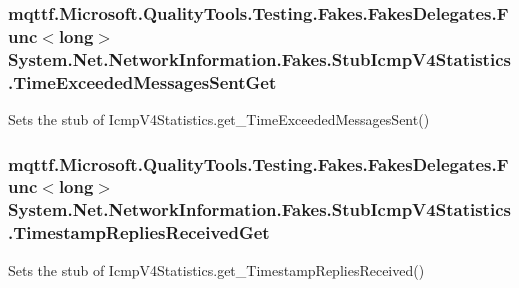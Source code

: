 \hypertarget{class_system_1_1_net_1_1_network_information_1_1_fakes_1_1_stub_icmp_v4_statistics_a84e4ced198b7d33838ece23dc51a16ee}{
\subsubsection[{Time\-Exceeded\-Messages\-Sent\-Get}]{\setlength{\rightskip}{0pt plus 5cm}mqttf.\-Microsoft.\-Quality\-Tools.\-Testing.\-Fakes.\-Fakes\-Delegates.\-Func$<$long$>$ System.\-Net.\-Network\-Information.\-Fakes.\-Stub\-Icmp\-V4\-Statistics.\-Time\-Exceeded\-Messages\-Sent\-Get}}\label{class_system_1_1_net_1_1_network_information_1_1_fakes_1_1_stub_icmp_v4_statistics_a84e4ced198b7d33838ece23dc51a16ee}


Sets the stub of Icmp\-V4\-Statistics.\-get\-\_\-\-Time\-Exceeded\-Messages\-Sent()

\hypertarget{class_system_1_1_net_1_1_network_information_1_1_fakes_1_1_stub_icmp_v4_statistics_af38cff5c15e50d66862f8182d35535c4}{
\subsubsection[{Timestamp\-Replies\-Received\-Get}]{\setlength{\rightskip}{0pt plus 5cm}mqttf.\-Microsoft.\-Quality\-Tools.\-Testing.\-Fakes.\-Fakes\-Delegates.\-Func$<$long$>$ System.\-Net.\-Network\-Information.\-Fakes.\-Stub\-Icmp\-V4\-Statistics.\-Timestamp\-Replies\-Received\-Get}}\label{class_system_1_1_net_1_1_network_information_1_1_fakes_1_1_stub_icmp_v4_statistics_af38cff5c15e50d66862f8182d35535c4}


Sets the stub of Icmp\-V4\-Statistics.\-get\-\_\-\-Timestamp\-Replies\-Received()

